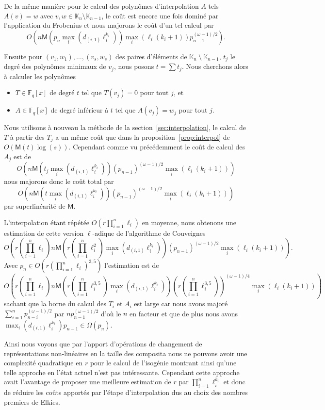 \documentclass[10pt,a4paper]{book}
\theoremstyle{plain}
\theoremstyle{definition}
\theoremstyle{definition}
\theoremstyle{definition}
\theoremstyle{definition}
\theoremstyle{definition}
\theoremstyle{remark}
\theoremstyle{remark}
\theoremstyle{definition}
\begin{document}
De la même manière pour le calcul des polynômes d'interpolation $A$ tels 
$A(v)=w$ avec $v,w \in \mathbb{K}_n \setminus \mathbb{K}_{n-1}$, le coût est
encore une fois dominé par l'application du Frobenius et nous majorons le coût 
d'un tel calcul par \[O(n\mathsf{M}(p_n \max_i(d_{(i,1)}\ell_i^{k_i}))
\max_i(\ell_i(k_i+1))p_{n-1}^{(\omega-1)/2}).\]

Ensuite pour $(v_1,w_1),\dots,(v_s,w_s)$ des paires d'éléments de 
$\mathbb{K}_n~\setminus~\mathbb{K}_{n-1}$, $t_j$ le degré des polynômes 
minimaux de $v_j$, nous posons $t=\sum t_j$. 
Nous cherchons alors à calculer les polynômes
  \begin{itemize}
  \item $T\in \mathbb{F}_q[x]$ de degré $t$ tel que $T(v_j)=0$ pour tout $j$,
    et
  \item $A\in \mathbb{F}_q[x]$ de degré inférieur à $t$ tel que $A(v_j)=w_j$ pour
    tout $j$.
  \end{itemize}
Nous utilisons à nouveau la méthode de la section~\ref{sec:interpolation}, le 
calcul de $T$ à partir des $T_j$ a un même coût que dans la 
proposition~\ref{prop:interpol} de $O(\mathsf{M}(t)\log(s))$. 
Cependant comme vu précédemment le coût de calcul des $A_j$ est de 
\[
O(n\mathsf{M}(t_j\max_i(d_{(i,1)}\ell_i^{k_i}))(p_{n-1})^{(\omega-1)/2}
\max_i(\ell_i(k_i+1)))
\]
nous majorons donc le coût total par
\[O(n\mathsf{M}(t\max_i(d_{(i,1)}
\ell_i^{k_i}))(p_{n-1})^{(\omega-1)/2}\max_i(\ell_i(k_i+1)))\]
par superlinéarité de 
$\mathsf{M}$.

L'interpolation étant répétée $O(r \prod_{i=1}^n\ell_i)$ en moyenne, nous 
obtenons une estimation de cette version $\ell$-adique de l'algorithme de 
Couveignes
\[ O(r (\prod_{i=1}^n\ell_i)n\mathsf{M}(r (\prod_{i=1}^n \ell_i^2)
\max_i(d_{(i,1)}\ell_i^{k_i}))(p_{n-1})^{(\omega-1)/2}\max_i(\ell_i (k_i +1)) ).\] 
Avec $p_n \in O(r(\prod_{i=1}^n\ell_i)^{3,5})$ l'estimation est de 
\[ 
O(r(\prod_{i=1}^n\ell_i)n\mathsf{M}(r (\prod_{i=1}^n \ell_i^{3,5})
\max_i(d_{(i,1)}\ell_i^{k_i}))(r (\prod_{i=1}^n \ell_i^{3,5}))^{(\omega-1)/4}
\max_i(\ell_i(k_i+1)) )
\]
sachant que la borne du calcul des $T_i$ et $A_i$ est large car nous avons 
majoré $\sum_{i=1}^np_{n-i}^{(\omega-1)/2}$ par $np_{n-1}^{(\omega-1)/2}$ d'où 
le $n$ en facteur et que de plus nous avons
$\max_i(d_{(i,1)}\ell_i^{k_i})p_{n-1} \in \Omega(p_n)$.

Ainsi nous voyons que par l'apport d'opérations de changement de 
représentations non-linéaires en la 
taille des composita nous ne pouvons avoir une complexité quadratique en $r$
pour le calcul de l'isogénie montrant ainsi qu'une telle approche en l'état 
actuel n'est pas intéressante. Cependant cette approche avait l'avantage de 
proposer une meilleure estimation de $r$ par $\prod_{i=1}^n \ell_i^{k_i}$ et 
donc de réduire les coûts apportés par l'étape d'interpolation dus au choix des
nombres premiers de Elkies.
\end{document}
